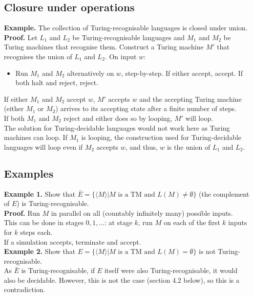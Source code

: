 \documentclass{article}
\begin{document}
\subsection{Closure under operations}
\textbf{Example.} The collection of Turing-recognisable languages is closed under union.
\\\textbf{Proof.} Let $L_1$ and $L_2$ be Turing-recognisable languages and $M_1$ and $M_2$ be Turing machines that recognise them. Construct a Turing machine $M'$ that recognises the union of $L_1$ and $L_2$. On input $w$:
\begin{itemize}
	\item Run $M_1$ and $M_2$ alternatively on $w$, step-by-step. If either accept, accept. If both halt and reject, reject.
\end{itemize}
If either $M_1$ and $M_2$ accept $w$, $M'$ accepts $w$ and the accepting Turing machine (either $M_1$ or $M_2$) arrives to its accepting state after a finite number of steps.\medskip
\\ If both $M_1$ and $M_2$ reject and either does so by looping, $M'$ will loop.
\\ The solution for Turing-decidable languages would not work here as Turing machines can loop. If $M_1$ is looping, the construction used for Turing-decidable languages will loop even if $M_2$ accepts $w$, and thus, $w$ is the union of $L_1$ and $L_2$.

\subsection{Examples}
\textbf{Example 1.} Show that $\bar{E} = \{\langle M\rangle|M\text{ is a TM and } L(M) \neq \emptyset\}$ (the complement of $E$) is Turing-recognisable.\medskip
\\\textbf{Proof.} Run $M$ in parallel on all (countably infinitely many) possible inputs.
\\ This can be done in stages $0, 1, ...$: at stage $k$, run $M$ on each of the first $k$ inputs for $k$ steps each.
\\ If a simulation accepts, terminate and accept.\medskip
\\\textbf{Example 2.} Show that $E = \{\langle M\rangle|M\text{ is a TM and } L(M) = \emptyset\}$ is not Turing-recognisable.\medskip
\\ As $\bar{E}$ is Turing-recognisable, if $E$ itself were also Turing-recognisable, it would also be decidable. However, this is not the case (section 4.2 below), so this is a contradiction. 
\end{document}

